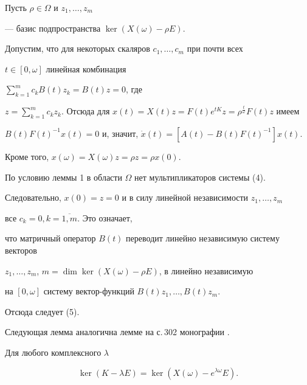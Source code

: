 \begin{pf} Пусть $\rho\in\Omega$ и $z_1,\dotsc,z_m$


--- базис подпространства $\ker(X(\omega) - \rho E)$.


Допустим, что для некоторых скаляров $c_1,\dotsc,c_m$ при почти всех 


$t\in [0,\omega]$ линейная комбинация 


$\sum\limits_{k=1}^m c_kB(t)z_k = B(t)z =0$, где


$z=\sum\limits_{k=1}^m c_k z_k$. Отсюда для $x(t)=X(t)z=F(t)e^{tK}z=


\rho^{\frac{t}{\omega}}F(t)z$ имеем


$B(t)F(t)^{-1}x(t)=0$ и, значит, $\Dot x(t)=[A(t)-B(t)F(t)^{-1}]x(t)$.


Кроме того, $x(\omega)=X(\omega)z=\rho z=\rho x(0)$.


По условию леммы 1 в области $\Omega$ нет мультипликаторов системы (4).


Следовательно, $x(0)=z=0$ и в силу линейной независимости $z_1,\dotsc,z_m$


все $c_k=0, k=\overline{1,m}$. Это означает,


что матричный оператор $B(t)$ переводит линейно независимую систему векторов


$z_1,\dotsc,z_m$, $m=\dim\ker(X(\omega) - \rho E)$, в линейно независимую


на $[0,\omega]$ систему вектор-функций $B(t)z_1,\dotsc,B(t)z_m$. 


Отсюда следует (5).


\end{pf}





Следующая лемма аналогична лемме на с.\,302 монографии \cite{1}.





\begin{lem} Для любого комплексного $\lambda$


\begin{equation}


\ker(K-\lambda E) = \ker(X(\omega) - e^{\lambda\omega}E).


\end{equation}


\end{lem}





